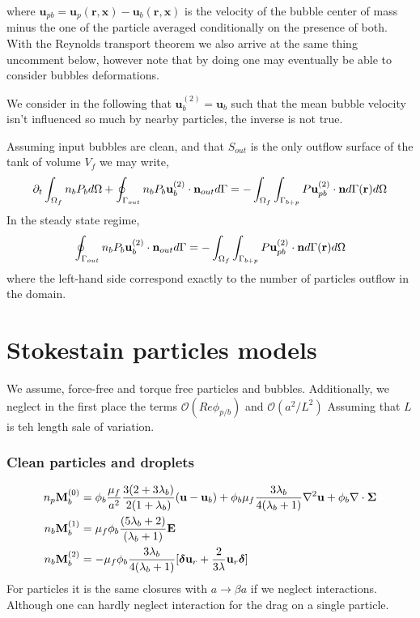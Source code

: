\documentclass[12pt]{My_preprint}
\begin{document}
where $\textbf{u}_{pb} = \textbf{u}_p(\textbf{r},\textbf{x}) - \textbf{u}_b(\textbf{r},\textbf{x})$ is the velocity of the bubble center of mass minus the one of the particle averaged conditionally on the presence of both. 
With the Reynolds transport theorem we also arrive at the same thing uncomment below, however note that by doing one may eventually be able to consider bubbles deformations. 


We consider in the following that $\textbf{u}_b^{(2)} = \textbf{u}_b$ such that the mean bubble velocity isn't influenced so much by nearby particles, the inverse is not true. 

Assuming input bubbles are clean, and that $S_{out}$ is the only outflow surface of the tank of volume $V_f$ we may write, 
\begin{equation}
    \pddt \intOf{ n_bP_b}
    + \intS[out]{ n_b P_b \textbf{u}_b^{(2)} \cdot \textbf{n}_{out}}
    =  
    - \intOf{\int_{\Gamma_{b+p}} P \textbf{u}_{pb}^{(2)}\cdot \textbf{n} d\Gamma(\textbf{r})}
\end{equation}
In  the steady state regime, 
\begin{equation}
    \intS[out]{ n_b P_b \textbf{u}_b^{(2)} \cdot \textbf{n}_{out}}
    =  
    - \intOf{\int_{\Gamma_{b+p}} P \textbf{u}_{pb}^{(2)}\cdot \textbf{n} d\Gamma(\textbf{r})}
\end{equation}
where the left-hand side correspond exactly to the number of particles outflow in the domain. 


\section{Stokestain particles models }
We assume, force-free and torque free particles and bubbles. 
Additionally, we neglect in the first place the terms $\mathcal{O}(Re \phi_{p/b})$ and $\mathcal{O}(a^2/L^2)$ Assuming that $L$ is teh length sale of variation. 

\subsubsection*{Clean particles and droplets}

\begin{align}
    n_p \textbf{M}_b^{(0)}
    &=
    \phi_b
    \frac{\mu_f}{a^2}
    \frac{3(2+3\lambda_b)}{2(1+\lambda_b)}(\textbf{u} - \textbf{u}_b)
    + \phi_b\mu_f  \frac{3\lambda_b}{4(\lambda_b +1)} \grad^2 \textbf{u}
    + \phi_b \div\bm\Sigma
    \\
    n_b \textbf{M}_b^{(1)}
    &= \mu_f \phi_b 
    \frac{(5\lambda_b +2)}{(\lambda_b +1)}\textbf{E} 
    \\
    n_b \textbf{M}_b^{(2)} 
    &=
    - \mu_f \phi_b \frac{3\lambda_b}{4(\lambda_b +1)}[\bm\delta \textbf{u}_r + \frac{2}{3\lambda}\textbf{u}_r \bm\delta ]
\end{align}
For particles it is the same closures with $a \to \beta a$ if we neglect interactions. 
Although one can hardly neglect interaction for the drag on a single particle. 
\end{document}
